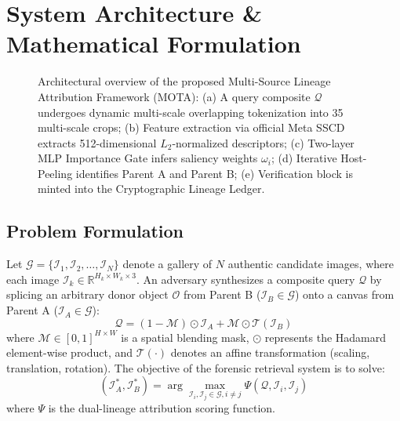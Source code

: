 \documentclass[journal]{IEEEtran}
\begin{document}
\section{System Architecture \& Mathematical Formulation}

\begin{figure}[t]
\centering
\fbox{\rule{0pt}{2.2in} \rule{0.95\linewidth}{0pt}}
\caption{Architectural overview of the proposed Multi-Source Lineage Attribution Framework (MOTA): (a) A query composite $\mathcal{Q}$ undergoes dynamic multi-scale overlapping tokenization into 35 multi-scale crops; (b) Feature extraction via official Meta SSCD extracts 512-dimensional $L_2$-normalized descriptors; (c) Two-layer MLP Importance Gate infers saliency weights $\omega_i$; (d) Iterative Host-Peeling identifies Parent A and Parent B; (e) Verification block is minted into the Cryptographic Lineage Ledger.}
\label{fig:architecture}
\end{figure}

\subsection{Problem Formulation}
Let $\mathcal{G} = \{\mathcal{I}_1, \mathcal{I}_2, \dots, \mathcal{I}_N\}$ denote a gallery of $N$ authentic candidate images, where each image $\mathcal{I}_k \in \mathbb{R}^{H_k \times W_k \times 3}$. An adversary synthesizes a composite query $\mathcal{Q}$ by splicing an arbitrary donor object $\mathcal{O}$ from Parent B ($\mathcal{I}_B \in \mathcal{G}$) onto a canvas from Parent A ($\mathcal{I}_A \in \mathcal{G}$):
\begin{equation}
\mathcal{Q} = (1 - \mathcal{M}) \odot \mathcal{I}_A + \mathcal{M} \odot \mathcal{T}(\mathcal{I}_B)
\label{eq:composite_definition}
\end{equation}
where $\mathcal{M} \in [0, 1]^{H \times W}$ is a spatial blending mask, $\odot$ represents the Hadamard element-wise product, and $\mathcal{T}(\cdot)$ denotes an affine transformation (scaling, translation, rotation). The objective of the forensic retrieval system is to solve:
\begin{equation}
(\mathcal{I}_A^*, \mathcal{I}_B^*) = \arg\max_{\mathcal{I}_i, \mathcal{I}_j \in \mathcal{G}, i \neq j} \Psi(\mathcal{Q}, \mathcal{I}_i, \mathcal{I}_j)
\end{equation}
where $\Psi$ is the dual-lineage attribution scoring function.
\end{document}
